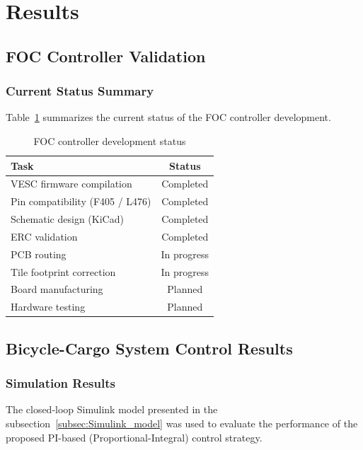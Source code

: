 \section{Results}

\subsection{FOC Controller Validation}
	
	\subsubsection{Current Status Summary}
	
	Table~\ref{tab:foc_status} summarizes the current status of the FOC 
	controller development.
	
	\begin{table}[htbp]
	\caption{FOC controller development status}
	\label{tab:foc_status}
	\centering
	\begin{tabular}{l c}
	\toprule
	\textbf{Task} & \textbf{Status} \\
	\midrule
	VESC firmware compilation & Completed \\
	Pin compatibility (F405 / L476) & Completed \\
	Schematic design (KiCad) & Completed \\
	ERC validation & Completed \\
	PCB routing & In progress \\
	Tile footprint correction & In progress \\
	Board manufacturing & Planned \\
	Hardware testing & Planned \\
	\bottomrule
	\end{tabular}
	\end{table}

\subsection{Bicycle-Cargo System Control Results}

\subsubsection{Simulation Results}
The closed-loop Simulink model presented in the subsection~\ref{subsec:Simulink_model} was used to evaluate the performance of the proposed PI-based (Proportional-Integral) control strategy.

